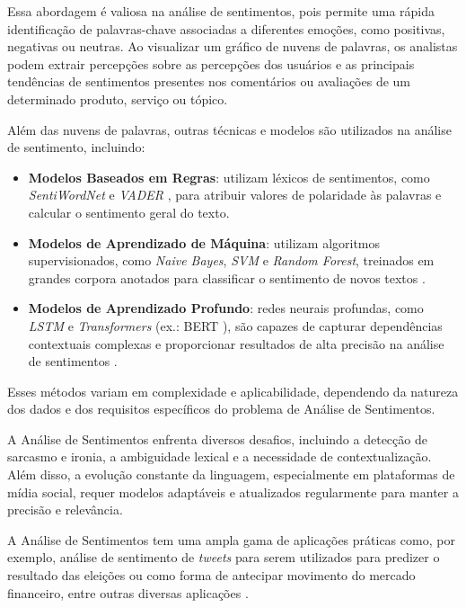 Essa abordagem é valiosa na análise de sentimentos, pois permite uma rápida identificação de palavras-chave associadas a diferentes emoções, como positivas, negativas ou neutras. Ao visualizar um gráfico de nuvens de palavras, os analistas podem extrair percepções sobre as percepções dos usuários e as principais tendências de sentimentos presentes nos comentários ou avaliações de um determinado produto, serviço ou tópico.

Além das nuvens de palavras, outras técnicas e modelos são utilizados na análise de sentimento, incluindo:

\begin{itemize}
    \item \textbf{Modelos Baseados em Regras}: utilizam léxicos de sentimentos, como \textit{SentiWordNet} \cite{Baccianella2010} e \textit{VADER} \cite{Hutto2014}, para atribuir valores de polaridade às palavras e calcular o sentimento geral do texto.
    \item \textbf{Modelos de Aprendizado de Máquina}: utilizam algoritmos supervisionados, como \textit{Naive Bayes}, \textit{SVM} e \textit{Random Forest}, treinados em grandes corpora anotados para classificar o sentimento de novos textos \cite{Pang2002, Liu2012}.
    \item \textbf{Modelos de Aprendizado Profundo}: redes neurais profundas, como \textit{LSTM} e \textit{Transformers} (ex.: BERT \cite{Devlin2019}), são capazes de capturar dependências contextuais complexas e proporcionar resultados de alta precisão na análise de sentimentos \cite{Zhang2018}.
\end{itemize}

Esses métodos variam em complexidade e aplicabilidade, dependendo da natureza dos dados e dos requisitos específicos do problema de Análise de Sentimentos.

A Análise de Sentimentos enfrenta diversos desafios, incluindo a detecção de sarcasmo e ironia, a ambiguidade lexical e a necessidade de contextualização. Além disso, a evolução constante da linguagem, especialmente em plataformas de mídia social, requer modelos adaptáveis e atualizados regularmente para manter a precisão e relevância.


A Análise de Sentimentos tem uma ampla gama de aplicações práticas como, por exemplo, análise de sentimento de \textit{tweets} para serem utilizados para predizer o resultado das eleições ou como forma de antecipar movimento do mercado financeiro, entre outras diversas aplicações \cite{Liu2012}.

